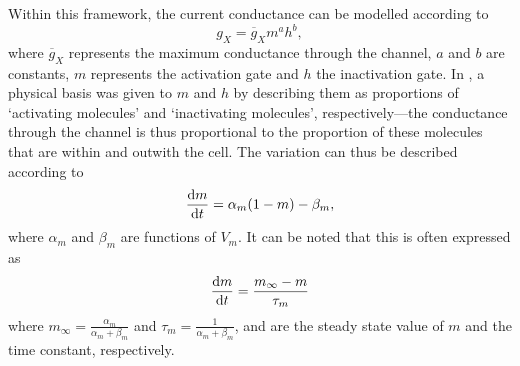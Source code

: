 \documentclass[../thesis-main.tex]{subfiles}
\begin{document}
 Within this framework, the current conductance can be modelled according to
 \begin{equation}
  g_X = \overline{g}_Xm^a h^b,
 \end{equation}
 where $\overline{g}_X$ represents the maximum conductance through the channel, $a$ and $b$ are constants, $m$ represents the activation gate and $h$ the inactivation gate. In \citet{Hodgkin1952}, a physical basis was given to $m$ and $h$ by describing them as proportions of `activating molecules' and `inactivating molecules', respectively---the conductance through the channel is thus proportional to the proportion of these molecules that are within and outwith the cell. The variation can thus be described according to
 \begin{equation}
  \frac{\textnormal{d}m}{\textnormal{d}t} = \alpha_m(1-m)-\beta_m,
 \end{equation}
 where $\alpha_m$ and $\beta_m$ are functions of $V_m$. It can be noted that this is often expressed as
 \begin{equation}
  \frac{\textnormal{d}m}{\textnormal{d}t} = \frac{m_\infty-m}{\tau_m}
 \end{equation}
 where $m_\infty=\frac{\alpha_m}{\alpha_m+\beta_m}$ and $\tau_m=\frac{1}{\alpha_m+\beta_m}$, and are the steady state value of $m$ and the time constant, respectively.
 
\end{document}
